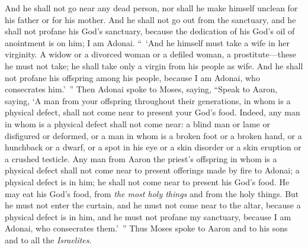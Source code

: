 \begin{biblechapter}
\verse And he shall not go near any dead person, nor shall he make himself unclean for his father or for his mother.
\verse And he shall not go out from the sanctuary, and he shall not profane his God’s sanctuary, because the dedication of his God’s oil of anointment is on him; I am Adonai.
\verse “ ‘And he himself must take a wife in her virginity.
\verse A widow or a divorced woman or a defiled woman, a prostitute—these he must not take; he shall take only a virgin from his people as wife.
\verse And he shall not profane his offspring among his people, because I am Adonai, who consecrates him.’ ”
\verse Then Adonai spoke to Moses, saying,
\verse “Speak to Aaron, saying, ‘A man from your offspring throughout their generations, in whom is a physical defect, shall not come near to present your God’s food.
\verse Indeed, any man in whom is a physical defect shall not come near: a blind man or lame or disfigured or deformed,
\verse or a man in whom is a broken foot or a broken hand,
\verse or a hunchback or a dwarf, or a spot in his eye or a skin disorder or a skin eruption or a crushed testicle.
\verse Any man from Aaron the priest’s offspring in whom is a physical defect shall not come near to present offerings made by fire to Adonai; a physical defect is in him; he shall not come near to present his God’s food.
\verse He may eat his God’s food, from \textit{the most holy things} and from the holy things.
\verse But he must not enter the curtain, and he must not come near to the altar, because a physical defect is in him, and he must not profane my sanctuary, because I am Adonai, who consecrates them.’ ”
\verse Thus Moses spoke to Aaron and to his sons and to all the \textit{Israelites}.
\end{biblechapter}

